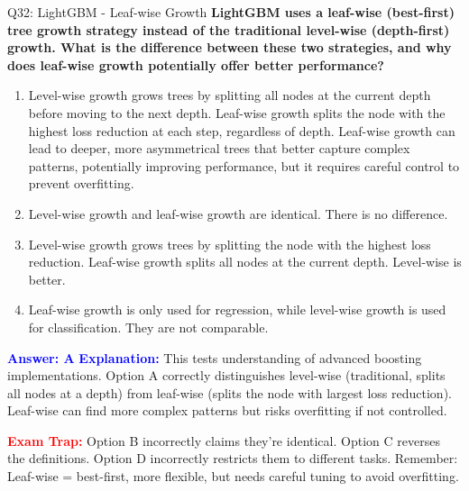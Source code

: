\documentclass[8pt]{beamer}
\begin{document}
	\begin{frame}{Q32: LightGBM - Leaf-wise Growth}
		\fontsize{6.5}{7.5}\selectfont
		\textbf{LightGBM uses a leaf-wise (best-first) tree growth strategy instead of the traditional level-wise (depth-first) growth. What is the difference between these two strategies, and why does leaf-wise growth potentially offer better performance?}
		
		\begin{enumerate}
			\item Level-wise growth grows trees by splitting all nodes at the current depth before moving to the next depth. Leaf-wise growth splits the node with the highest loss reduction at each step, regardless of depth. Leaf-wise growth can lead to deeper, more asymmetrical trees that better capture complex patterns, potentially improving performance, but it requires careful control to prevent overfitting.
			\item Level-wise growth and leaf-wise growth are identical. There is no difference.
			\item Level-wise growth grows trees by splitting the node with the highest loss reduction. Leaf-wise growth splits all nodes at the current depth. Level-wise is better.
			\item Leaf-wise growth is only used for regression, while level-wise growth is used for classification. They are not comparable.
		\end{enumerate}
		
		\vspace{0.1cm}
		\textcolor{blue}{\textbf{Answer: A}}
		\vspace{0.1cm}
		\textcolor{blue}{\textbf{Explanation:}} This tests understanding of advanced boosting implementations. Option A correctly distinguishes level-wise (traditional, splits all nodes at a depth) from leaf-wise (splits the node with largest loss reduction). Leaf-wise can find more complex patterns but risks overfitting if not controlled.
		
		\textcolor{red}{\textbf{Exam Trap:}} Option B incorrectly claims they're identical. Option C reverses the definitions. Option D incorrectly restricts them to different tasks. Remember: Leaf-wise = best-first, more flexible, but needs careful tuning to avoid overfitting.
	\end{frame}
	
\end{document}
